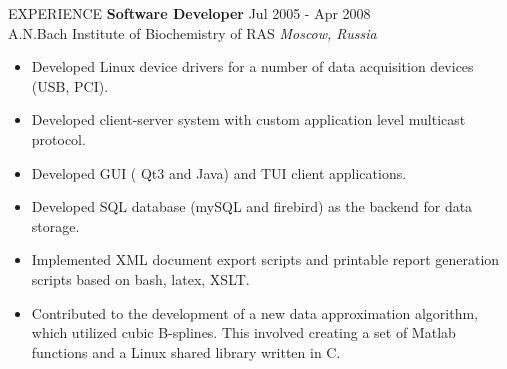 \documentclass{resume} %
\begin{document}
\begin{rSection}{EXPERIENCE}
\textbf{Software Developer} \hfill Jul 2005 - Apr 2008\\
A.N.Bach Institute of Biochemistry of RAS \hfill \textit{Moscow, Russia}
 \begin{itemize}
    \itemsep -3pt {}
    \item Developed Linux device drivers for a number of data acquisition devices (USB, PCI).
    \item Developed client-server system with custom application level multicast protocol.
    \item Developed GUI ( Qt3 and Java) and TUI client applications.
    \item Developed SQL database (mySQL and firebird) as the backend for data storage.
    \item Implemented XML document export scripts and printable report generation scripts based on bash, latex, XSLT.
    \item Contributed to the development of a new data approximation algorithm, which utilized cubic B-splines. This involved creating a set of Matlab functions and a Linux shared library written in C.
 \end{itemize}

\end{rSection} 
\end{document}

